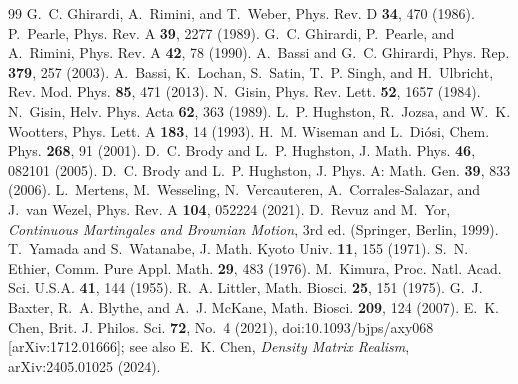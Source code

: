\documentclass[aps,pra,10pt,twocolumn,superscriptaddress,amsmath,amssymb,floatfix]{revtex4-2}
\begin{document}
\vspace{-8pt}
\begin{thebibliography}{99}
 G.~C. Ghirardi, A.~Rimini, and T.~Weber, Phys. Rev. D \textbf{34}, 470 (1986).
 P.~Pearle, Phys. Rev. A \textbf{39}, 2277 (1989).
 G.~C. Ghirardi, P.~Pearle, and A.~Rimini, Phys. Rev. A \textbf{42}, 78 (1990).
 A.~Bassi and G.~C. Ghirardi, Phys. Rep. \textbf{379}, 257 (2003).
 A.~Bassi, K.~Lochan, S.~Satin, T.~P. Singh, and H.~Ulbricht, Rev. Mod. Phys. \textbf{85}, 471 (2013).
 N.~Gisin, Phys. Rev. Lett. \textbf{52}, 1657 (1984).
 N.~Gisin, Helv. Phys. Acta \textbf{62}, 363 (1989).
 L.~P. Hughston, R.~Jozsa, and W.~K. Wootters, Phys. Lett. A \textbf{183}, 14 (1993).
 H.~M. Wiseman and L.~Di\'osi, Chem. Phys. \textbf{268}, 91 (2001).
 D.~C. Brody and L.~P. Hughston, J. Math. Phys. \textbf{46}, 082101 (2005).
 D.~C. Brody and L.~P. Hughston, J. Phys. A: Math. Gen. \textbf{39}, 833 (2006).
 L.~Mertens, M.~Wesseling, N.~Vercauteren, A.~Corrales-Salazar, and J.~van Wezel, Phys. Rev. A \textbf{104}, 052224 (2021).
 D.~Revuz and M.~Yor, \emph{Continuous Martingales and Brownian Motion}, 3rd ed. (Springer, Berlin, 1999).
 T.~Yamada and S.~Watanabe, J. Math. Kyoto Univ. \textbf{11}, 155 (1971).
 S.~N. Ethier, Comm. Pure Appl. Math. \textbf{29}, 483 (1976).
 M.~Kimura, Proc. Natl. Acad. Sci. U.S.A. \textbf{41}, 144 (1955).
 R.~A. Littler, Math. Biosci. \textbf{25}, 151 (1975).
 G.~J. Baxter, R.~A. Blythe, and A.~J. McKane, Math. Biosci. \textbf{209}, 124 (2007).
 E.~K. Chen, Brit. J. Philos. Sci. \textbf{72}, No.~4 (2021), doi:10.1093/bjps/axy068 [arXiv:1712.01666]; see also E.~K. Chen, \emph{Density Matrix Realism}, arXiv:2405.01025 (2024).
\end{thebibliography}
\end{document}
